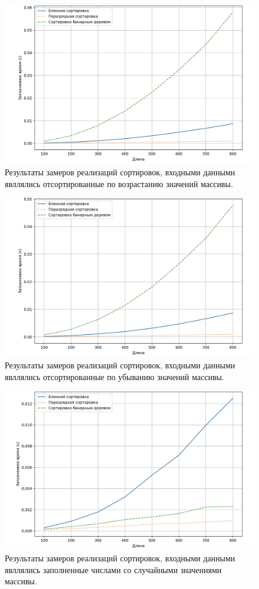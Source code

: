 \begin{figure}
	\includegraphics[scale=0.5]{img/graph_sorted}
	\caption{Результаты замеров реализаций сортировок, входными данными явллялись отсортированные по возрастанию значений массивы.}
	\label{fig:graph_sorted}
\end{figure}
\begin{figure}
	\includegraphics[scale=0.5]{img/graph_sorted_back}
	\caption{Результаты замеров реализаций сортировок, входными данными явллялись отсортированные по убыванию значений массивы.}
	\label{fig:graph_sorted_back}
\end{figure}
\begin{figure}
	\includegraphics[scale=0.5]{img/graph_random}
	\caption{Результаты замеров реализаций сортировок, входными данными явллялись заполненные числами со случайными значениями массивы.}
	\label{fig:graph_random}
\end{figure}
